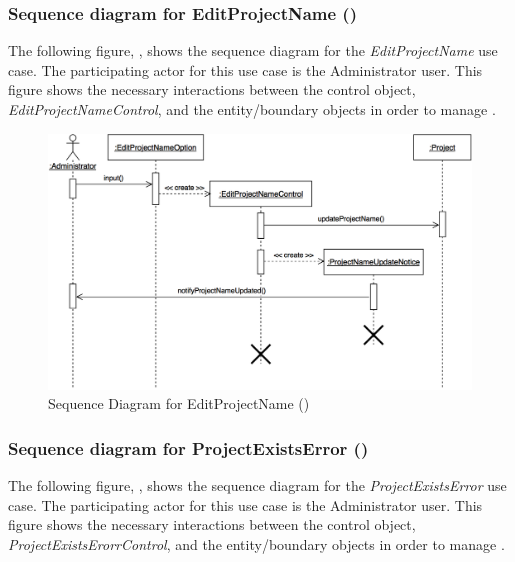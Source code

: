\documentclass[12pt,letterpaper]{article}
\begin{document}
\subsubsection*{Sequence diagram for EditProjectName ()}

The following figure, , shows the sequence diagram for the {\it EditProjectName} use case. The participating actor for this use case is the Administrator user. This figure shows the necessary interactions between the control object, {\it EditProjectNameControl}, and the
entity/boundary objects in order to manage .

\begin{figure}[H]
	\centering{}
	\includegraphics[scale=0.27]{imgs/seq/edit-project-name.png}
	\caption[ - Sequence Diagram for EditProjectName]{Sequence Diagram for EditProjectName ()}
\end{figure}

\newpage{}

\subsubsection*{Sequence diagram for ProjectExistsError ()}

The following figure, , shows the sequence diagram for the {\it ProjectExistsError} use case. The participating actor for this use case is
the Administrator user. This figure shows the necessary interactions between the control object, {\it ProjectExistsErorrControl}, and the
entity/boundary objects in order to manage .
\end{document}
